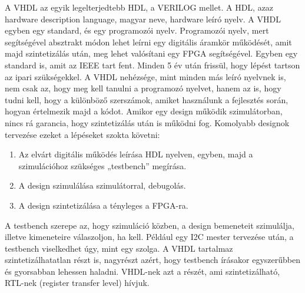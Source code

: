 \documentclass[a4paper,12pt,oneside]{book}
\begin{document}
A VHDL az egyik legelterjedtebb HDL, a VERILOG mellet. A HDL, azaz hardware description language, magyar neve, hardware leíró nyelv. A VHDL egyben egy standard, és egy programozói nyelv. Programozói nyelv, mert segítségével absztrakt módon lehet leírni egy digitális áramkör működését, amit majd szintetizálás után, meg lehet valósítani egy FPGA segítségével. Egyben egy standard is, amit az IEEE tart fent. Minden 5 év után frissül, hogy lépést tartson az ipari szükségekkel. A VHDL nehézsége, mint minden más leíró nyelvnek is, nem csak az, hogy meg kell tanulni a programozó nyelvet, hanem az is, hogy tudni kell, hogy a különböző szerszámok, amiket használunk a fejlesztés során, hogyan értelmezik majd a kódot. Amikor egy design működik szimulátorban, nincs rá garancia, hogy szintetizálás után is működni fog. Komolyabb designok tervezése ezeket a lépéseket szokta követni:
\begin{enumerate}[label=(\alph*)]
	\item Az elvárt digitális működés leírása HDL nyelven, egyben, majd a szimulációhoz szükséges „testbench” megírása.
	\item A design szimulálása szimulátorral, debugolás.
	\item A design szintetizálása a tényleges a FPGA-ra. 
\end{enumerate}
A testbench szerepe az, hogy szimuláció közben, a design bemeneteit szimulálja, illetve kimeneteire válaszoljon, ha kell. Például egy I2C mester tervezése után, a testbench viselkedhet úgy, mint egy szolga. A VHDL tartalmaz szintetizálhatatlan részt is, nagyrészt azért, hogy testbench írásakor egyszerűbben és gyorsabban lehessen haladni. VHDL-nek azt a részét, ami szintetizálható, RTL-nek (register transfer level) hívjuk.
\end{document}
